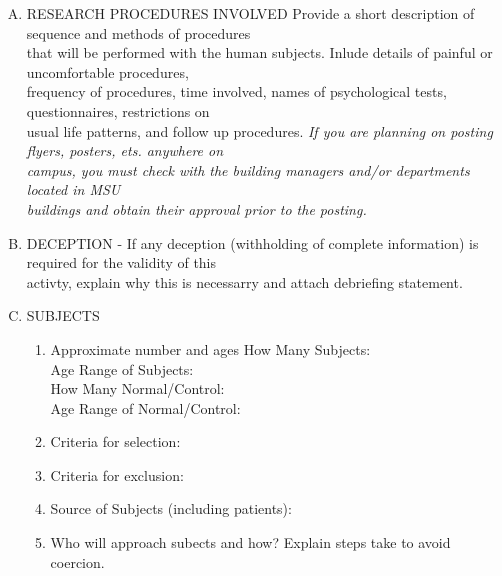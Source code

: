 \documentclass{article}
\begin{document}
\begin{enumerate}[I.]
\begin{enumerate}[A.]
        \item RESEARCH PROCEDURES INVOLVED Provide a short description of sequence and methods of procedures \\
        that will be performed with the human subjects. Inlude details of painful or uncomfortable procedures, \\
        frequency of procedures, time involved, names of psychological tests, questionnaires, restrictions on \\
        usual life patterns, and follow up procedures. \color{red} \emph{If you are planning on posting flyers, posters, ets. anywhere on \\
        campus, you must check with the building managers and/or departments located in MSU\\
        buildings and obtain their approval prior to the posting.}\\\color{black}

        \item DECEPTION - If any deception (withholding of complete information) is required for the validity of this\\
        activty, explain why this is necessarry and attach debriefing statement. \\

        \item SUBJECTS 
        \begin{enumerate}[1.]

            \item Approximate number and ages
            How Many Subjects:\\
            Age Range of Subjects:\\
            How Many Normal/Control:\\
            Age Range of Normal/Control:\\

            \item Criteria for selection: \\
            
            \item Criteria for exclusion: \\
            
            \item Source of Subjects (including patients): \\
            
            \item Who will approach subects and how? Explain steps take to avoid coercion. \\
            

\end{enumerate}
\end{enumerate}
\end{enumerate}
\end{document}
